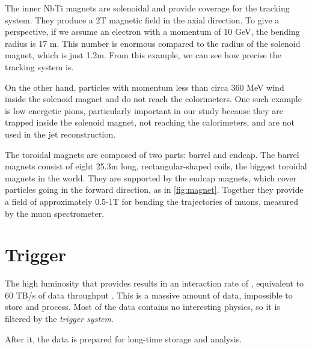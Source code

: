 The inner NbTi magnets are solenoidal and provide coverage for the tracking system.
They produce a 2T magnetic field in the axial direction.
To give a perspective, if we assume an electron with a momentum of 10 GeV, the bending radius is 17 m.
This number is enormous compared to the radius of the solenoid magnet, which is just 1.2m. 
From this example, we can see how precise the tracking system is.

On the other hand, particles with momentum less than circa 360 MeV wind inside the solenoid magnet and do not reach the colorimeters.
One such example is low energetic pions, particularly important in our study because they are trapped inside the solenoid magnet, not reaching the calorimeters, and are not used in the jet reconstruction.

The toroidal magnets are composed of two parts: barrel and endcap.
The barrel magnets consist of eight 25.3m long, rectangular-shaped coils, the biggest toroidal magnets in the world.
They are supported by the endcap magnets, which cover particles going in the forward direction, as in \cref{fig:magnet}.
Together they provide a field of approximately 0.5-1T for bending the trajectories of muons, measured by the muon spectrometer. 


\section{Trigger}
\label{sec:trigger}
The high luminosity that \LHC provides results in an interaction rate of , equivalent to 60 TB/s of data throughput \cite{trig}.
This is a massive amount of data, impossible to store and process.
Most of the data contains no interesting physics, so it is filtered by the \emph{trigger system}.


After it, the data is prepared for long-time storage and analysis.